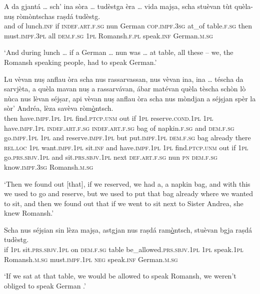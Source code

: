 \begin{linenumbers}
\gll    A da gjantá … sch’ ina sòra … tudèstga èra … vida majṣa, scha stuèvan tùt quèla- nuṣ ròmòntschas raṣdá tudèstg.\\
and of lunch.\textsc{inf} {} if \textsc{indef.art.f.sg} nun {} German \textsc{cop.impf.3sg} {} at\_of table.\textsc{f.sg} then must.\textsc{impf.3pl} all \textsc{dem.f.sg} \textsc{1pl} Romansh.\textsc{f.pl} speak.\textsc{inf} German.\textsc{m.sg}\\
\end{linenumbers}
\medskip
\glt `And during lunch … if a German … nun was … at table, all these – we, the Romansh speaking people, had to speak German.'
\medskip

\begin{linenumbers}
\gll    Lu vèvan nuṣ anflau òra scha nus rassarvassan, nus vèvan ina, ina … téscha da sarvjèta, a quèla mavan nuṣ a rassarvávan, ábar matévan quèla tèscha schòn lò nùca nus lèvan séjṣar, api vèvan nuṣ anflau òra scha nus mòndjan a séjṣjan spèr la sòr’ Andréa, lèza savèva ròm\underline{ò}ntsch.\\
then have.\textsc{impf.1pl} \textsc{1pl} find.\textsc{ptcp.unm} out if \textsc{1pl} reserve.\textsc{cond.1pl} \textsc{1pl} have.\textsc{impf.1pl} \textsc{indef.art.f.sg} \textsc{indef.art.f.sg} {} bag of napkin.\textsc{f.sg} and \textsc{dem.f.sg} go.\textsc{impf.1pl} \textsc{1pl} and reserve.\textsc{impf.1pl} but put.\textsc{impf.1pl} \textsc{dem.f.sg} bag already there \textsc{rel.loc} \textsc{1pl}  want.\textsc{impf.1pl} sit.\textsc{inf} and have.\textsc{impf.1pl} \textsc{1pl}  find.\textsc{ptcp.unm} out if \textsc{1pl} go.\textsc{prs.sbjv.1pl} and sit.\textsc{prs.sbjv.1pl} next  \textsc{def.art.f.sg} nun \textsc{pn} \textsc{dem.f.sg} know.\textsc{impf.3sg} Romansh.\textsc{m.sg}\\
\end{linenumbers}
\medskip
\glt `Then we found out [that], if we reserved, we had a, a napkin bag, and with this we used to go and reserve, but we used to put that bag already where we wanted to sit, and then we found out that if we went to sit next to Sister Andrea, she knew Romansh.'
\medskip

\begin{linenumbers}
\gll Scha nus séjṣian sin lèza majṣa, astgjan nus raṣdá ram\underline{ò}ntsch, stuèvan bgja raṣdá tudèstg.\\
if \textsc{1pl} sit.\textsc{prs.sbjv.1pl} on \textsc{dem.f.sg} table be\_allowed.\textsc{prs.sbjv.1pl} \textsc{1pl} speak.\textsc{1pl} Romansh.\textsc{m.sg} must.\textsc{impf.1pl} \textsc{neg} speak.\textsc{inf} German.\textsc{m.sg}\\
\end{linenumbers}
\medskip
\glt `If we sat at that table, we would be allowed to speak Romansh, we weren’t obliged to speak German .'
\medskip

